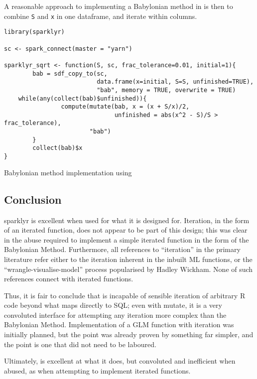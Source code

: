 A reasonable approach to implementing a Babylonian method in  is
then to combine \texttt{S} and \texttt{x} in one dataframe, and iterate
within columns.

\begin{listing}
	\begin{verbatim}
library(sparklyr)

sc <- spark_connect(master = "yarn")

sparklyr_sqrt <- function(S, sc, frac_tolerance=0.01, initial=1){
        bab = sdf_copy_to(sc,
                          data.frame(x=initial, S=S, unfinished=TRUE),
                          "bab", memory = TRUE, overwrite = TRUE)
	while(any(collect(bab)$unfinished)){
                compute(mutate(bab, x = (x + S/x)/2,
                               unfinished = abs(x^2 - S)/S > frac_tolerance),
                        "bab")
        }
        collect(bab)$x
}
\end{verbatim}
	\caption{Babylonian method implementation using }
	\label{lst:sparklyr-bab}
\end{listing}

\hypertarget{sec:conclusion}{%
	\subsection{Conclusion}\label{sec:conclusion}}

sparklyr is excellent when used for what it is designed for. Iteration,
in the form of an iterated function, does not appear to be part of this
design; this was clear in the abuse required to implement a simple
iterated function in the form of the Babylonian Method. Furthermore, all
references to ``iteration'' in the primary  literature refer
either to the iteration inherent in the inbuilt  ML functions, or
the ``wrangle-visualise-model'' process popularised by Hadley
Wickham\cite{luraschi2019mastering}\cite{wickham2016r}. None of such
references connect with iterated functions.

Thus, it is fair to conclude that  is incapable of sensible
iteration of arbitrary R code beyond what maps directly to SQL; even
with mutate, it is a very convoluted interface for attempting any
iteration more complex than the Babylonian Method. Implementation of a
GLM function with  iteration was initially planned, but the
point was already proven by something far simpler, and the point is one
that did not need to be laboured.

Ultimately,  is excellent at what it does, but convoluted and
inefficient when abused, as when attempting to implement iterated
functions.